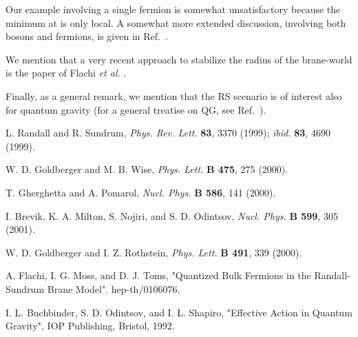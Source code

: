 \documentclass[a4paper,12pt]{article}
\begin{document}
Our example involving a single fermion is somewhat unsatisfactory because the minimum at \coordHE{} is only local. A somewhat more extended discussion, involving both bosons and fermions, is given in Ref.~\cite{brevik01}.

We mention that a very recent approach to stabilize the radius of the brane-world \coordHE{} is the paper of Flachi {\it et al.} \cite{flachi01}. 

Finally, as a general remark, we mention that the RS scenario is of interest also for quantum gravity (for a general treatise on QG, see Ref.~\cite{buchbinder92}).


\newpage

\begin{thebibliography}{99}

L. Randall and R. Sundrum, {\it Phys. Rev. Lett.} {\bf 83}, 3370 (1999); {\it ibid.} {\bf 83}, 4690 (1999).

W. D. Goldberger and M. B. Wise, {\it Phys. Lett.} {\bf B 475}, 275 (2000).

T. Gherghetta and A. Pomarol, {\it Nucl. Phys.} {\bf B 586}, 141 (2000).

I. Brevik, K. A. Milton, S. Nojiri, and S. D. Odintsov, {\it Nucl. Phys.} {\bf B 599}, 305 (2001).

W. D. Goldberger and I. Z. Rothstein, {\it Phys. Lett.} {\bf B 491}, 339 (2000).

A. Flachi, I. G. Moss, and D. J. Toms, "Quantized Bulk Fermions in the Randall-Sundrum Brane Model". hep-th/0106076.

I. L. Buchbinder, S. D. Odintsov, and I. L. Shapiro, "Effective Action in Quantum Gravity", IOP Publishing, Bristol, 1992. 




\end{thebibliography}
\end{document}
